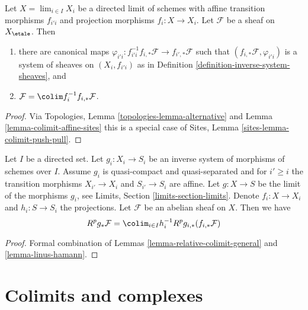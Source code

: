 \begin{lemma}
\label{lemma-linus-hamann}
Let $X = \lim_{i \in I} X_i$ be a directed limit of schemes
with affine transition morphisms $f_{i'i}$ and projection morphisms
$f_i : X \to X_i$. Let $\mathcal{F}$ be a sheaf on $X_\etale$. Then
\begin{enumerate}
\item there are canonical maps
$\varphi_{i'i} : f_{i'i}^{-1}f_{i, *}\mathcal{F} \to f_{i', *}\mathcal{F}$
such that $(f_{i, *}\mathcal{F}, \varphi_{i'i})$ is a system of
sheaves on $(X_i, f_{i'i})$ as in
Definition \ref{definition-inverse-system-sheaves}, and
\item $\mathcal{F} = \colim f_i^{-1}f_{i, *}\mathcal{F}$.
\end{enumerate}
\end{lemma}

\begin{proof}
Via Topologies, Lemma \ref{topologies-lemma-alternative} and
Lemma \ref{lemma-colimit-affine-sites} this is a special case of
Sites, Lemma \ref{sites-lemma-colimit-push-pull}.
\end{proof}

\begin{lemma}
\label{lemma-compute-strangely}
Let $I$ be a directed set. Let $g_i : X_i \to S_i$ be an inverse system of
morphisms of schemes over $I$. Assume $g_i$ is quasi-compact and
quasi-separated and for $i' \geq i$ the transition morphisms
$X_{i'} \to X_i$ and $S_{i'} \to S_i$ are affine.
Let $g : X \to S$ be the limit of the morphisms $g_i$, see
Limits, Section \ref{limits-section-limits}.
Denote $f_i : X \to X_i$ and $h_i : S \to S_i$ the projections.
Let $\mathcal{F}$ be an  abelian sheaf on $X$. Then we have
$$
R^pg_*\mathcal{F} = \colim_{i \in I} h_i^{-1}R^pg_{i, *}(f_{i, *}\mathcal{F})
$$
\end{lemma}

\begin{proof}
Formal combination of Lemmas \ref{lemma-relative-colimit-general}
and \ref{lemma-linus-hamann}.
\end{proof}











\section{Colimits and complexes}
\label{section-colimit-complexes}

